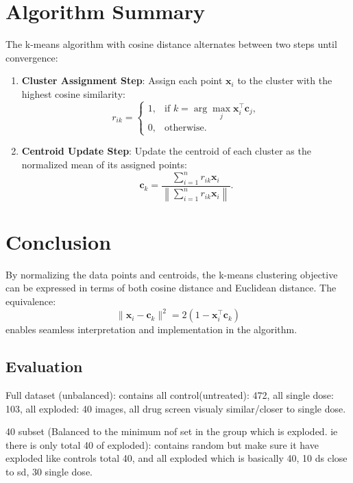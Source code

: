 \section*{Algorithm Summary}

The k-means algorithm with cosine distance alternates between two steps until convergence:

\begin{enumerate}
    \item \textbf{Cluster Assignment Step}: Assign each point \( \mathbf{x}_i \) to the cluster with the highest cosine similarity:
    \[
    r_{ik} =
    \begin{cases}
    1, & \text{if } k = \arg\max_{j} \mathbf{x}_i^\top \mathbf{c}_j, \\
    0, & \text{otherwise.}
    \end{cases}
    \]

    \item \textbf{Centroid Update Step}: Update the centroid of each cluster as the normalized mean of its assigned points:
    \[
    \mathbf{c}_k = \frac{\sum_{i=1}^{n} r_{ik} \mathbf{x}_i}{\left\| \sum_{i=1}^{n} r_{ik} \mathbf{x}_i \right\|}.
    \]
\end{enumerate}

\section*{Conclusion}

By normalizing the data points and centroids, the k-means clustering objective can be expressed in terms of both cosine distance and Euclidean distance. The equivalence:
\[
\|\mathbf{x}_i - \mathbf{c}_k\|^2 = 2(1 - \mathbf{x}_i^\top \mathbf{c}_k)
\]
enables seamless interpretation and implementation in the algorithm.



\subsection{Evaluation}

Full dataset (unbalanced): contains all control(untreated): 472, all single dose: 103, all exploded: 40 images, all drug screen visualy similar/closer to single dose.

40 subset (Balanced to the minimum nof set in the group which is exploded. ie there is only total 40 of exploded): contains random but make sure it have exploded like 
controls total 40, and all exploded which is basically 40, 10 ds close to sd, 30 single dose.


